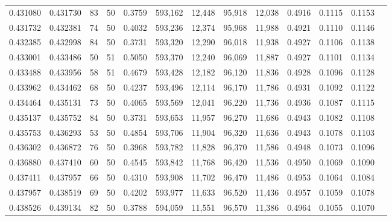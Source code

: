 \begin{tabular}{rrrrrrrrrrrrr}
0.431080 & 0.431730 &    83 &  50 &                                     0.3759 & 593,162 &  12,448 &  95,918 &  12,038 & 0.4916 & 0.1115 & 0.1153 \\
0.431732 & 0.432381 &    74 &  50 &                                     0.4032 & 593,236 &  12,374 &  95,968 &  11,988 & 0.4921 & 0.1110 & 0.1146 \\
0.432385 & 0.432998 &    84 &  50 &                                     0.3731 & 593,320 &  12,290 &  96,018 &  11,938 & 0.4927 & 0.1106 & 0.1138 \\
0.433001 & 0.433486 &    50 &  51 &                                     0.5050 & 593,370 &  12,240 &  96,069 &  11,887 & 0.4927 & 0.1101 & 0.1134 \\
0.433488 & 0.433956 &    58 &  51 &                                     0.4679 & 593,428 &  12,182 &  96,120 &  11,836 & 0.4928 & 0.1096 & 0.1128 \\
0.433962 & 0.434462 &    68 &  50 &                                     0.4237 & 593,496 &  12,114 &  96,170 &  11,786 & 0.4931 & 0.1092 & 0.1122 \\
0.434464 & 0.435131 &    73 &  50 &                                     0.4065 & 593,569 &  12,041 &  96,220 &  11,736 & 0.4936 & 0.1087 & 0.1115 \\
0.435137 & 0.435752 &    84 &  50 &                                     0.3731 & 593,653 &  11,957 &  96,270 &  11,686 & 0.4943 & 0.1082 & 0.1108 \\
0.435753 & 0.436293 &    53 &  50 &                                     0.4854 & 593,706 &  11,904 &  96,320 &  11,636 & 0.4943 & 0.1078 & 0.1103 \\
0.436302 & 0.436872 &    76 &  50 &                                     0.3968 & 593,782 &  11,828 &  96,370 &  11,586 & 0.4948 & 0.1073 & 0.1096 \\
0.436880 & 0.437410 &    60 &  50 &                                     0.4545 & 593,842 &  11,768 &  96,420 &  11,536 & 0.4950 & 0.1069 & 0.1090 \\
0.437411 & 0.437957 &    66 &  50 &                                     0.4310 & 593,908 &  11,702 &  96,470 &  11,486 & 0.4953 & 0.1064 & 0.1084 \\
0.437957 & 0.438519 &    69 &  50 &                                     0.4202 & 593,977 &  11,633 &  96,520 &  11,436 & 0.4957 & 0.1059 & 0.1078 \\
0.438526 & 0.439134 &    82 &  50 &                                     0.3788 & 594,059 &  11,551 &  96,570 &  11,386 & 0.4964 & 0.1055 & 0.1070 \\

\end{tabular}
